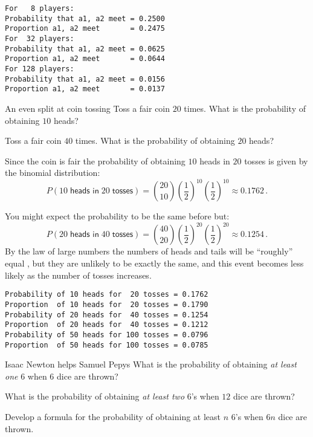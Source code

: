 \newpage

\sml{}
\begin{verbatim}
For   8 players:
Probability that a1, a2 meet = 0.2500
Proportion a1, a2 meet       = 0.2475
For  32 players:
Probability that a1, a2 meet = 0.0625
Proportion a1, a2 meet       = 0.0644
For 128 players:
Probability that a1, a2 meet = 0.0156
Proportion a1, a2 meet       = 0.0137
\end{verbatim}


\begin{prob}{An even split at coin tossing}
 Toss a fair coin $20$ times. What is the probability of obtaining $10$ heads?

 Toss a fair coin $40$ times. What is the probability of obtaining $20$ heads?
\end{prob}

\solution{}

 Since the coin is fair the probability of obtaining $10$ heads in $20$ tosses is given by the binomial distribution:
\[
P(10\;\textsf{heads in}\; 20\; \textsf{tosses})={20 \choose 10} \left(\frac{1}{2}\right)^{10}\left(\frac{1}{2}\right)^{10} \approx 0.1762\,.
\]

 You might expect the probability to be the same before but:
\[
P(20\;\textsf{heads in}\; 40\; \textsf{tosses})={40 \choose 20} \left(\frac{1}{2}\right)^{20}\left(\frac{1}{2}\right)^{20}\approx 0.1254\,.
\]
By the law of large numbers the numbers of heads and tails will be ``roughly'' equal \cite[Section~8.4]{ross}, but they are unlikely to be exactly the same, and this event becomes less likely as the number of tosses increases.

\sml{}
\begin{verbatim}
Probability of 10 heads for  20 tosses = 0.1762
Proportion  of 10 heads for  20 tosses = 0.1790
Probability of 20 heads for  40 tosses = 0.1254
Proportion  of 20 heads for  40 tosses = 0.1212
Probability of 50 heads for 100 tosses = 0.0796
Proportion  of 50 heads for 100 tosses = 0.0785
\end{verbatim}


\begin{prob}{Isaac Newton helps Samuel Pepys}
 What is the probability of obtaining \emph{at least one} $6$ when $6$ dice are thrown?

 What is the probability of obtaining \emph{at least two} $6$'s when $12$ dice are thrown?

 Develop a formula for the probability of obtaining at least $n$ $6$'s when $6n$ dice are thrown.
\end{prob}

